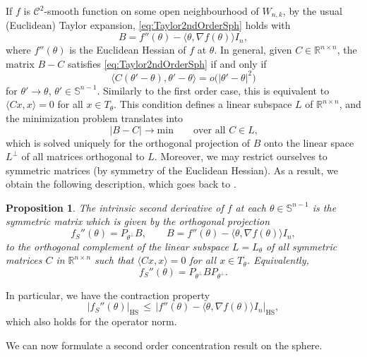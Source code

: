\documentclass[a4paper,12pt]{amsart}
\numberwithin{equation}{section}
\newtheorem{proposition}[satz]{Proposition}
\theoremstyle{remark}
\def\S{{\mathbb S}}
\begin{document}
If $f$ is $\mathcal{C}^2$-smooth function on some open neighbourhood of $W_{n,k}$, by the usual (Euclidean) Taylor expansion, \eqref{eq:Taylor2ndOrderSph} holds with
\begin{equation}\label{eq:MatrixBSph}
	B = f''(\theta) - \langle \theta, \nabla f(\theta)\rangle I_n,
\end{equation}
where $f''(\theta)$ is the Euclidean Hessian of $f$ at $\theta$. In general, given $C \in \mathbb{R}^{n \times n}$, the matrix $B - C$ satisfies \eqref{eq:Taylor2ndOrderSph} if and only if
\[
\langle C(\theta' - \theta), \theta'-\theta\rangle = o\big(|\theta'-\theta|^2\big)
\]
for $\theta' \to \theta$, $\theta' \in \S^{n-1}$. Similarly to the first order case, this is equivalent to $\langle Cx, x \rangle = 0$ for all $x \in T_\theta$. This condition defines a linear subspace $L$ of $\mathbb{R}^{n \times n}$, and the minimization problem translates into
\[
\lvert B - C \rvert \to \mathrm{min}\qquad \text{over all $C \in L$,}
\]
which is solved uniquely for the orthogonal projection of $B$ onto the linear space $L^\perp$ of all matrices orthogonal to $L$. Moreover, we may restrict ourselves to symmetric matrices (by symmetry of the Euclidean Hessian). As a result, we obtain the following description, which goes back to \cite[Prop.\ 8.1]{BCG17}.

\begin{proposition}\label{2ndOrDerSph}
	The intrinsic second derivative of $f$ at each $\theta \in \S^{n-1}$ is the symmetric matrix which is given by the orthogonal projection
	\[
	f_S''(\theta) = P_{\theta^\perp} B, \qquad B = f''(\theta) - \langle \theta, \nabla f(\theta)\rangle I_n,
	\]
	to the orthogonal complement of the linear subspace $L = L_\theta$ of all symmetric matrices $C$ in $\mathbb{R}^{n \times n}$ such that $\langle Cx, x \rangle = 0$ for all $x \in T_\theta$. Equivalently,
	\[
	f_S''(\theta) = P_{\theta^\perp} B P_{\theta^\perp}.
	\]
\end{proposition}

In particular, we have the contraction property
\[
\vert f_S''(\theta)\rvert_\mathrm{HS} \, \leq \, \lvert f''(\theta) - \langle \theta, \nabla f(\theta)\rangle I_n\rvert_{\mathrm{HS}},
\]
which also holds for the operator norm.

We can now formulate a second order concentration result on the sphere.
\end{document}
